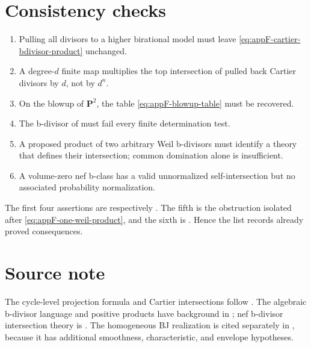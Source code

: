 \section{Consistency checks}
\label{sec:appF-unit-tests}

\begin{enumerate}
\item Pulling all divisors to a higher birational model must leave
      \eqref{eq:appF-cartier-bdivisor-product} unchanged.
\item A degree-\(d\) finite map multiplies the top intersection of pulled
      back Cartier divisors by \(d\), not by \(d^n\).
\item On the blowup of \(\mathbf P^2\), the table
      \eqref{eq:appF-blowup-table} must be recovered.
\item The b-divisor of
       must fail every finite
      determination test.
\item A proposed product of two arbitrary Weil b-divisors must identify a
      theory that defines their intersection; common domination alone is
      insufficient.
\item A volume-zero nef b-class has a valid unnormalized self-intersection
      but no associated probability normalization.
\end{enumerate}

The first four assertions are respectively
.
The fifth is the obstruction isolated after
\eqref{eq:appF-one-weil-product}, and the sixth is
.  Hence the list records already proved
consequences.

\section*{Source note}
\label{sec:appF-source-note}

The cycle-level projection formula and Cartier intersections follow
\cite{Ful}.
The algebraic b-divisor language and positive products have background in
\cite{BFJ09}; nef b-divisor intersection theory is \cite{DF20}.
The homogeneous BJ realization is cited separately in
, because it has additional
smoothness, characteristic, and envelope hypotheses.
